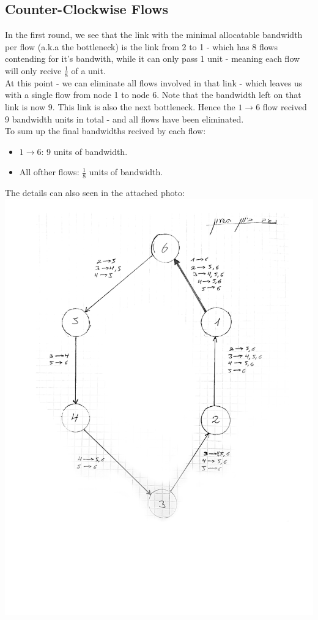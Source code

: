 \documentclass{article}
\begin{document}
\subsection{Counter-Clockwise Flows}
In the first round, we see that the link with the minimal
allocatable bandwidth per flow (a.k.a the bottleneck) is the link from
2 to 1 - which has 8 flows contending for it's bandwith, while it can only
pass 1 unit - meaning each flow will only recive $\frac{1}{8}$ of a unit.\\
At this point - we can eliminate all flows involved in that link - 
which leaves us with a single flow from node 1 to node 6.
Note that the bandwidth left on that link is now 9. This link is also
the next bottleneck. Hence the $1\rightarrow 6$ flow recived 9 bandwidth units
in total - and all flows have been eliminated.\\
To sum up the final bandwidths recived by each flow:
\begin{itemize}
    \item $1\rightarrow 6$: 9 units of bandwidth.
    \item All ofther flows: $\frac{1}{8}$ units of bandwidth.
\end{itemize}
The details can also seen in the attached photo:\\
\includegraphics[width=\textwidth]{i1.png}
\end{document}
